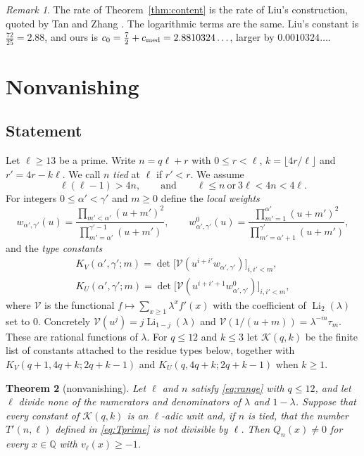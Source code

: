 \documentclass[11pt]{amsart}
\newtheorem{theorem}{Theorem}[section]
\theoremstyle{definition}
\theoremstyle{remark}
\newtheorem{remark}[theorem]{Remark}
\numberwithin{equation}{section}
\newcommand{\Q}{\mathbb Q}
\newcommand{\Li}{\operatorname{Li}}
\begin{document}
\begin{remark}
The rate of Theorem~\ref{thm:content} is the rate of Liu's construction, quoted by Tan and Zhang
\cite[(2.2)]{TanZhang26}. The logarithmic terms are the same. Liu's constant is $\frac{72}{25}=2.88$, and ours is
$c_0=\frac72+c_{\rm med}=2.8810324\ldots$, larger by $0.0010324\ldots$.
\end{remark}

\section{Nonvanishing}\label{sec:nv}

\subsection{Statement}
Let $\ell\ge13$ be a prime. Write $n=q\ell+r$ with $0\le r<\ell$, $k=\lfloor4r/\ell\rfloor$ and $r'=4r-k\ell$. We call
$n$ \emph{tied} at $\ell$ if $r'<r$. We assume
\begin{equation}\label{eq:range}
 \ell(\ell-1)>4n,\qquad\text{and}\qquad \ell\le n\ \text{or}\ 3\ell<4n<4\ell .
\end{equation}
For integers $0\le\alpha'<\gamma'$ and $m\ge0$ define the \emph{local weights}
\[
 w_{\alpha',\gamma'}(u)=\frac{\prod_{m'<\alpha'}(u+m')^2}{\prod_{m'=\alpha'}^{\gamma'-1}(u+m')},\qquad
 w^0_{\alpha',\gamma'}(u)=\frac{\prod_{m'=1}^{\alpha'}(u+m')^2}{\prod_{m'=\alpha'+1}^{\gamma'}(u+m')},
\]
and the \emph{type constants}
\begin{gather*}
 K_V(\alpha',\gamma';m)=\det\bigl[\mathcal V(u^{i+i'}w_{\alpha',\gamma'})\bigr]_{i,i'<m},\\
 K_U(\alpha',\gamma';m)=\det\bigl[\mathcal V(u^{i+i'+1}w^0_{\alpha',\gamma'})\bigr]_{i,i'<m},
\end{gather*}
where $\mathcal V$ is the functional $f\mapsto\sum_{x\ge1}\lambda^xf'(x)$ with the coefficient of $\Li_2(\lambda)$ set to
$0$. Concretely $\mathcal V(u^j)=j\Li_{1-j}(\lambda)$ and $\mathcal V(1/(u+m))=\lambda^{-m}\tau_m$. These are
rational functions of $\lambda$. For $q\le12$ and $k\le3$ let $\mathcal K(q,k)$ be the finite list of constants
attached to the residue types below, together with $K_V(q+1,4q+k;2q+k-1)$ and $K_U(q,4q+k;2q+k-1)$ when $k\ge1$.

\begin{theorem}[nonvanishing]\label{thm:NV}
Let $\ell$ and $n$ satisfy \eqref{eq:range} with $q\le12$, and let $\ell$ divide none of the numerators and
denominators of $\lambda$ and $1-\lambda$. Suppose that every constant of $\mathcal K(q,k)$ is an $\ell$-adic unit and,
if $n$ is tied, that the number $T'(n,\ell)$ defined in \eqref{eq:Tprime} is not divisible by $\ell$. Then
$Q_n(x)\ne0$ for every $x\in\Q$ with $v_\ell(x)\ge-1$.
\end{theorem}
\end{document}
